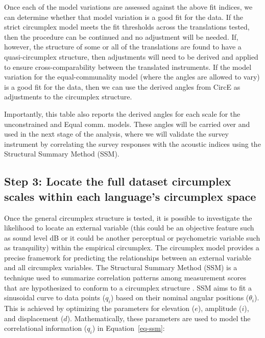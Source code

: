 \documentclass[
  authoryear,
  preprint,
  3p]{elsarticle}
\begin{document}
Once each of the model variations are assessed against the above fit
indices, we can determine whether that model variation is a good fit for
the data. If the strict circumplex model meets the fit thresholds across
the translations tested, then the procedure can be continued and no
adjustment will be needed. If, however, the structure of some or all of
the translations are found to have a quasi-circumplex structure, then
adjustments will need to be derived and applied to ensure
cross-comparability between the translated instruments. If the model
variation for the equal-communality model (where the angles are allowed
to vary) is a good fit for the data, then we can use the derived angles
from CircE as adjustments to the circumplex structure.

Importantly, this table also reports the derived angles for each scale
for the unconstrained and Equal comm. models. These angles will be
carried over and used in the next stage of the analysis, where we will
validate the survey instrument by correlating the survey responses with
the acoustic indices using the Structural Summary Method (SSM).

\subsection{Step 3: Locate the full dataset circumplex scales within
each language's circumplex
space}\label{step-3-locate-the-full-dataset-circumplex-scales-within-each-languages-circumplex-space}

Once the general circumplex structure is tested, it is possible to
investigate the likelihood to locate an external variable (this could be
an objective feature such as sound level dB or it could be another
perceptual or psychometric variable such as tranquility) within the
empirical circumplex. The circumplex model provides a precise framework
for predicting the relationships between an external variable and all
circumplex variables. The Structural Summary Method (SSM) is a technique
used to summarize correlation patterns among measurement scores that are
hypothesized to conform to a circumplex structure
\citep{Rogoza2021three}. SSM aims to fit a sinusoidal curve to data
points (\(q_i\)) based on their nominal angular positions
(\(\theta_i\)). This is achieved by optimizing the parameters for
elevation (\(e\)), amplitude (\(i\)), and displacement (\(d\)).
Mathematically, these parameters are used to model the correlational
information (\(q_i\)) in Equation~\ref{eq-ssm}:
\end{document}
